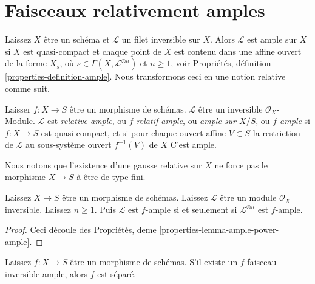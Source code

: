 \section{Faisceaux relativement amples}
\label{section-relatively-ample}

\noindent
Laissez $X$ être un schéma et $\mathcal{L}$ un filet inversible sur $X$. Alors $\mathcal{L}$ est ample sur $X$ si $X$ est quasi-compact et chaque point de $X$ est contenu dans une affine ouvert de la forme $X_s$, où $s \in \Gamma(X, \mathcal{L}^{\otimes n})$ et $n \geq 1$, voir Propriétés, définition \ref{properties-definition-ample}. Nous transformons ceci en une notion relative comme suit.

\begin{definition}

\label{definition-relatively-ample}

\begin{reference}

\cite[II définition 4.6.1]{EGA}

\end{reference}

Laisser $f : X \to S$ être un morphisme de schémas. $\mathcal{L}$ être un inversible $\mathcal{O}_X$- Module. $\mathcal{L}$ est {\it relative ample}, ou {\it  $f$-relatif ample}, ou {\it ample sur $X/S$}, ou {\it  $f$-ample} si $f : X \to S$
est quasi-compact, et si pour chaque ouvert affine $V \subset S$
la restriction de $\mathcal{L}$ au sous-système ouvert
$f^{-1}(V)$ de $X$ C'est ample.

\end{definition}

\noindent
Nous notons que l'existence d'une gausse relative sur $X$ ne force pas le morphisme $X \to S$ à être de type fini.

\begin{lemma}

\label{lemma-ample-power-ample}
Laissez $X \to S$ être un morphisme de schémas. Laissez $\mathcal{L}$ être un module $\mathcal{O}_X$ inversible. Laissez $n \geq 1$. Puis $\mathcal{L}$ est $f$-ample si et seulement si $\mathcal{L}^{\otimes n}$ est $f$-ample.
\end{lemma}

\begin{proof}
Ceci découle des Propriétés, deme \ref{properties-lemma-ample-power-ample}.
\end{proof}

\begin{lemma}

\label{lemma-relatively-ample-separated}
Laissez $f : X \to S$ être un morphisme de schémas. S'il existe un $f$-faisceau inversible ample, alors $f$ est séparé.
\end{lemma}

